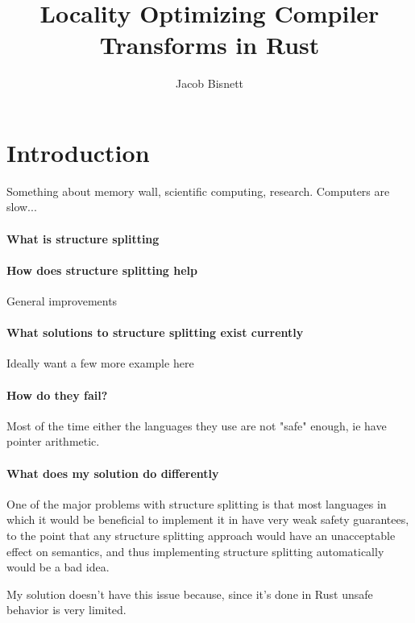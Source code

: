\documentclass[12pt,final]{article}
\begin{document}
\title{Locality Optimizing Compiler Transforms in Rust}
\author{Jacob Bisnett}
\maketitle

\section{Introduction}
\label{sec:intro}

Something about memory wall, scientific computing, research. Computers are slow...

\paragraph{What is structure splitting}

\paragraph{How does structure splitting help}
General improvements

\paragraph{What solutions to structure splitting exist currently}
Ideally want a few more example here

\paragraph{How do they fail?}
Most of the time either the languages they use are not "safe" enough, ie have pointer arithmetic. 

\paragraph{What does my solution do differently}

One of the major problems with
structure splitting is that most languages in which it would be beneficial to
implement it in have very weak safety guarantees, to the point that any
structure splitting approach would have an unacceptable effect on semantics, and
thus implementing structure splitting automatically would be a bad idea.

My solution doesn't have this issue because, since it's done in Rust unsafe behavior is very limited.
\end{document}
